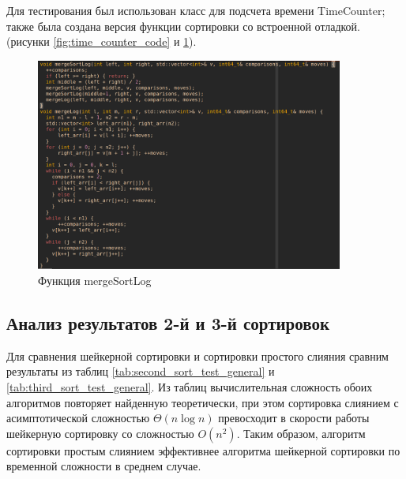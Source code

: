 \documentclass[a4paper, 14pt]{extarticle}
\begin{document}
Для тестирования был использован класс для подсчета времени TimeCounter;
также была создана версия функции сортировки со встроенной отладкой.
(рисунки \ref{fig:time_counter_code} и \ref{fig:third_sort_log}).
\begin{figure}[htpb]
  \centering
  \includegraphics[width=0.9\textwidth]{pictures/third_sort_log.png}
  \caption{Функция mergeSortLog}
  \label{fig:third_sort_log}
\end{figure}


\subsection{Анализ результатов 2-й и 3-й сортировок}
Для сравнения шейкерной сортировки и сортировки простого слияния
сравним результаты из таблиц \ref{tab:second_sort_test_general} и
\ref{tab:third_sort_test_general}. Из таблиц
вычислительная сложность обоих алгоритмов повторяет найденную
теоретически, при этом сортировка слиянием с асимптотической сложностью
$\Theta(n\log n)$ превосходит в скорости работы шейкерную сортировку 
со сложностью $O(n^2)$.
Таким образом, алгоритм сортировки простым слиянием эффективнее
алгоритма шейкерной сортировки по временной
сложности в среднем случае.
\end{document}

